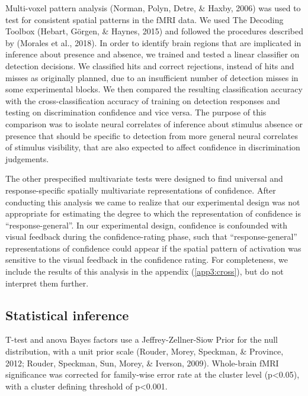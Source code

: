 \documentclass[12pt,twoside]{reedthesis}
\begin{document}
Multi-voxel pattern analysis (Norman, Polyn, Detre, \& Haxby, 2006) was used to test for consistent spatial patterns in the fMRI data. We used The Decoding Toolbox (Hebart, Görgen, \& Haynes, 2015) and followed the procedures described by (Morales et al., 2018). In order to identify brain regions that are implicated in inference about presence and absence, we trained and tested a linear classifier on detection decisions. We classified hits and correct rejections, instead of hits and misses as originally planned, due to an insufficient number of detection misses in some experimental blocks. We then compared the resulting classification accuracy with the cross-classification accuracy of training on detection responses and testing on discrimination confidence and vice versa. The purpose of this comparison was to isolate neural correlates of inference about stimulus absence or presence that should be specific to detection from more general neural correlates of stimulus visibility, that are also expected to affect confidence in discrimination judgements.

The other prespecified multivariate tests were designed to find universal and response-specific spatially multivariate representations of confidence. After conducting this analysis we came to realize that our experimental design was not appropriate for estimating the degree to which the representation of confidence is ``response-general''. In our experimental design, confidence is confounded with visual feedback during the confidence-rating phase, such that ``response-general'' representations of confidence could appear if the spatial pattern of activation was sensitive to the visual feedback in the confidence rating. For completeness, we include the results of this analysis in the appendix (\ref{app3:cross}), but do not interpret them further.

\hypertarget{statistical-inference}{%
\subsection{Statistical inference}\label{statistical-inference}}

T-test and anova Bayes factors use a Jeffrey-Zellner-Siow Prior for the null distribution, with a unit prior scale (Rouder, Morey, Speckman, \& Province, 2012; Rouder, Speckman, Sun, Morey, \& Iverson, 2009). Whole-brain fMRI significance was corrected for family-wise error rate at the cluster level (p\textless0.05), with a cluster defining threshold of p\textless0.001.
\end{document}
